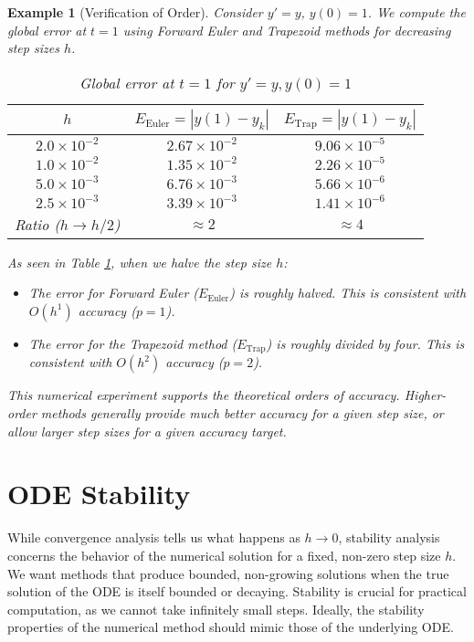\documentclass{article}
\newtheorem{example}{Example}
\begin{document}
\begin{example}[Verification of Order]
Consider $y'=y$, $y(0)=1$. We compute the global error at $t=1$ using Forward Euler and Trapezoid methods for decreasing step sizes $h$.

\begin{table}[h]
\centering
\caption{Global error at $t=1$ for $y'=y, y(0)=1$}
\label{tab:convergence}
\begin{tabular}{|c|c|c|}
\hline
$h$ & $E_{\text{Euler}} = |y(1) - y_k|$ & $E_{\text{Trap}} = |y(1) - y_k|$ \\
\hline
$2.0 \times 10^{-2}$ & $2.67 \times 10^{-2}$ & $9.06 \times 10^{-5}$ \\
$1.0 \times 10^{-2}$ & $1.35 \times 10^{-2}$ & $2.26 \times 10^{-5}$ \\
$5.0 \times 10^{-3}$ & $6.76 \times 10^{-3}$ & $5.66 \times 10^{-6}$ \\
$2.5 \times 10^{-3}$ & $3.39 \times 10^{-3}$ & $1.41 \times 10^{-6}$ \\
\hline
Ratio ($h \to h/2$) & $\approx 2$ & $\approx 4$ \\
\hline
\end{tabular}
\end{table}

As seen in Table \ref{tab:convergence}, when we halve the step size $h$:
\begin{itemize}
    \item The error for Forward Euler ($E_{\text{Euler}}$) is roughly halved. This is consistent with $O(h^1)$ accuracy ($p=1$).
    \item The error for the Trapezoid method ($E_{\text{Trap}}$) is roughly divided by four. This is consistent with $O(h^2)$ accuracy ($p=2$).
\end{itemize}
This numerical experiment supports the theoretical orders of accuracy. Higher-order methods generally provide much better accuracy for a given step size, or allow larger step sizes for a given accuracy target.
\end{example}

\section{ODE Stability}

While convergence analysis tells us what happens as $h \to 0$, stability analysis concerns the behavior of the numerical solution for a fixed, non-zero step size $h$. We want methods that produce bounded, non-growing solutions when the true solution of the ODE is itself bounded or decaying. Stability is crucial for practical computation, as we cannot take infinitely small steps. Ideally, the stability properties of the numerical method should mimic those of the underlying ODE.
\end{document}
